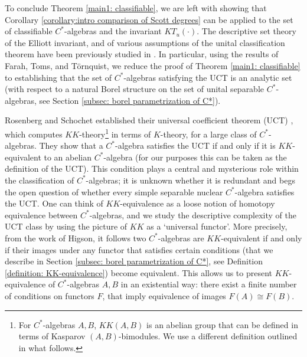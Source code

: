 \documentclass[12pt]{amsart}
\begin{document}
To conclude Theorem \ref{main1: classifiable}, we are left with showing that Corollary \ref{corollary:intro comparison of Scott degrees} can be applied to the set of classifiable $C^*$-algebras and the invariant $KT_u(\cdot)$.
The descriptive set theory of the Elliott invariant, and of various assumptions of the unital classification theorem have been previously studied in \cite{farah2013descriptive}. 
In particular, using the results of Farah, Toms, and T\"ornquist, we reduce the proof of Theorem \ref{main1: classifiable} to establishing that the set of $C^*$-algebras satisfying the UCT is an analytic set (with respect to a natural Borel structure on the set of unital separable $C^*$-algebras, see Section \ref{subsec: borel parametrization of C*}).

Rosenberg and Schochet established their universal coefficient theorem (UCT) \cite{RosenbergSchochetUCT}, which computes $KK$-theory\footnote{For $C^*$-algebras $A, B$, $KK(A,B)$ is an abelian group that can be defined in terms of Kasparov $(A,B)$-bimodules. We use a different definition outlined in what follows.} in terms of $K$-theory, for a large class of $C^*$-algebras. 
They show that a $C^*$-algebra satisfies the UCT if and only if it is $KK$-equivalent to an abelian $C^*$-algebra (for our purposes this can be taken as the definition of the UCT). 
This condition plays a central and mysterious role within the classification of $C^*$-algebras; it is unknown whether it is redundant and begs the open question of whether every simple separable nuclear $C^*$-algebra satisfies the UCT. 
One can think of $KK$-equivalence as a loose notion of homotopy equivalence between $C^*$-algebras, and we study the descriptive complexity of the UCT class by using the picture of $KK$ as a `universal functor'. More precisely, from the work \cite{Higson-KKtheory} of Higson, it follows two $C^*$-algebras are $KK$-equivalent if and only if their images under any functor that satisfies certain conditions (that we describe in Section \ref{subsec: borel parametrization of C*}, see Definition \ref{definition: KK-equivalence}) become equivalent. This allows us to present $KK$-equivalence of $C^*$-algebras $A, B$ in an existential way: there exist a finite number of conditions on functors $F$, that imply equivalence of images $F(A) \cong F(B)$.
\end{document}
